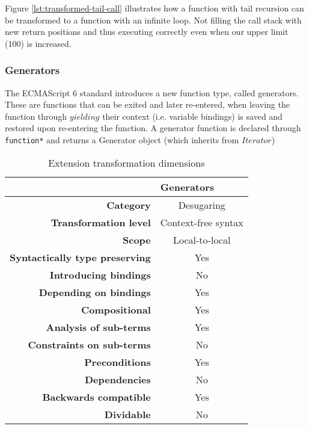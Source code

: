 \documentclass[10pt,a4paper]{article}
\begin{document}
Figure \ref{lst:transformed-tail-call} illustrates how a function with tail recursion can be transformed to a function with an infinite loop. Not filling the call stack with new return positions and thus executing correctly even when our upper limit (100) is increased.

\subsubsection{Generators}
The ECMAScript 6 standard introduces a new function type, called generators\cite[14.4]{SpecJS}. These are functions that can be exited and later re-entered, when leaving the function through $yielding$ their context (i.e. variable bindings) is saved and restored upon re-entering the function. A generator function is declared through \lstinline$function*$ and returns a Generator object (which inherits from $Iterator$)

\begin{table}[H]
\centering
\caption{Extension transformation dimensions}
\label{generators-table}
\begin{tabular}{@{}rc@{}}
\toprule
                                       & \multicolumn{1}{l}{\textbf{Generators}} \\ \midrule
\textbf{Category}                      & Desugaring
\\
\textbf{Transformation level}          & Context-free syntax                          \\
\textbf{Scope}                         & Local-to-local                               \\
\textbf{Syntactically type preserving} & Yes                                          \\
\textbf{Introducing bindings}          & No                                          \\%
\textbf{Depending on bindings}         & Yes                                           \\
\textbf{Compositional}                 & Yes                                          \\
\textbf{Analysis of sub-terms}          & Yes                                          \\
\textbf{Constraints on sub-terms}       & No                                           \\
\textbf{Preconditions}                 & Yes                                          \\
\textbf{Dependencies}                  & No                                           \\
\textbf{Backwards compatible}          & Yes                                          \\
\textbf{Dividable}                     & No                                           \\ \bottomrule
\end{tabular}
\end{table}
\end{document}
